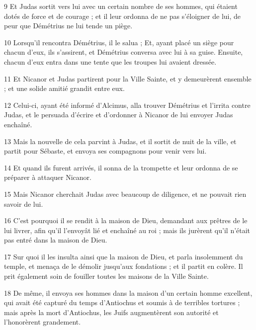 \par 9 Et Judas sortit vers lui avec un certain nombre de ses hommes, qui étaient dotés de force et de courage ; et il leur ordonna de ne pas s'éloigner de lui, de peur que Démétrius ne lui tende un piège.

\par 10 Lorsqu'il rencontra Démétrius, il le salua ; Et, ayant placé un siège pour chacun d'eux, ils s'assirent, et Démétrius conversa avec lui à sa guise. Ensuite, chacun d'eux entra dans une tente que les troupes lui avaient dressée.

\par 11 Et Nicanor et Judas partirent pour la Ville Sainte, et y demeurèrent ensemble ; et une solide amitié grandit entre eux.

\par 12 Celui-ci, ayant été informé d'Alcimus, alla trouver Démétrius et l'irrita contre Judas, et le persuada d'écrire et d'ordonner à Nicanor de lui envoyer Judas enchaîné.

\par 13 Mais la nouvelle de cela parvint à Judas, et il sortit de nuit de la ville, et partit pour Sébaste, et envoya ses compagnons pour venir vers lui.

\par 14 Et quand ils furent arrivés, il sonna de la trompette et leur ordonna de se préparer à attaquer Nicanor.

\par 15 Mais Nicanor cherchait Judas avec beaucoup de diligence, et ne pouvait rien savoir de lui.

\par 16 C'est pourquoi il se rendit à la maison de Dieu, demandant aux prêtres de le lui livrer, afin qu'il l'envoyât lié et enchaîné au roi ; mais ils jurèrent qu'il n'était pas entré dans la maison de Dieu.

\par 17 Sur quoi il les insulta ainsi que la maison de Dieu, et parla insolemment du temple, et menaça de le démolir jusqu'aux fondations ; et il partit en colère. Il prit également soin de fouiller toutes les maisons de la Ville Sainte.

\par 18 De même, il envoya ses hommes dans la maison d'un certain homme excellent, qui avait été capturé du temps d'Antiochus et soumis à de terribles tortures ; mais après la mort d'Antiochus, les Juifs augmentèrent son autorité et l'honorèrent grandement.

